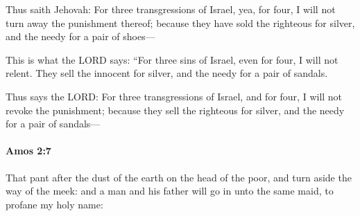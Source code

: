 			\begin{versebox}
					\item[BHS] 
					\item[LXX] 
					\item[ASV] Thus saith Jehovah: For three transgressions of Israel, yea, for four, I will not turn away the punishment thereof; because they have sold the righteous for silver, and the needy for a pair of shoes—
					\item[NIV] This is what the LORD says: “For three sins of Israel, even for four, I will not relent. They sell the innocent for silver, and the needy for a pair of sandals.
					\item[NRSV] Thus says the LORD: For three transgressions of Israel, and for four, I will not revoke the punishment; because they sell the righteous for silver, and the needy for a pair of sandals—
			\end{versebox}

		\paragraph{Amos 2:7} %
			\label{AMOS-2-7}

			That pant after the dust of the earth on the head of the poor, and turn aside the way of the meek: and a man and his father will go in unto the same maid, to profane my holy name:

